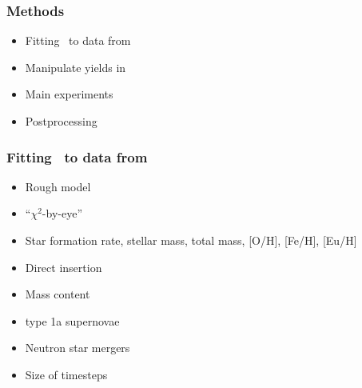\begin{frame}
\frametitle{Methods}
\begin{itemize}
\item Fitting \omegamodel\ to data from \eris
\item Manipulate yields in \omegamodel
\item Main experiments
\item Postprocessing
\end{itemize}
\end{frame}

\begin{frame}
  \frametitle{Fitting \omegamodel\ to data from \eris}
  \begin{minipage}{0.45\linewidth}
    \begin{itemize}
    \item Rough model
    \item ``$\chi^2$-by-eye''
    \item Star formation rate, stellar mass, total mass, [O/H], [Fe/H], [Eu/H]
    \end{itemize}
  \end{minipage}
  \hfill
  \begin{minipage}{0.45\linewidth}
    \begin{itemize}
    \item Direct insertion
    \item Mass content
    \item type 1a supernovae
    \item Neutron star mergers
    \item Size of timesteps
    \end{itemize}
  \end{minipage}
\end{frame}

